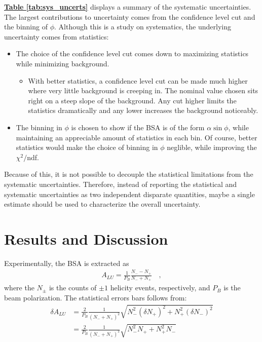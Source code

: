 \documentclass[10pt,prd,aps,showpacs,twocolumn,unsortedaddress]{revtex4-1}
\newcommand\lr[1]{\left( #1\right) }
\renewcommand\b[1]{{\textbf{#1}}}
\renewcommand\u[1]{{\underline{#1}}}
\newcommand\Tab[1]{\b{\u{Table #1}}}
\begin{document}
\Tab{\ref{tab:sys_uncerts}} displays a summary of the systematic uncertainties. The largest contributions to uncertainty comes from the confidence level cut and the binning of $\phi$. Although this is a study on systematics, the underlying uncertainty comes from statistics:
\begin{itemize}
  \item
    The choice of the confidence level cut comes down to maximizing statistics while minimizing background.
      \begin{itemize}
        \item
          With better statistics, a confidence level cut can be made much higher where very little background is creeping in. The nominal value chosen sits right on a steep slope of the background. Any cut higher limits the statistics dramatically and any lower increases the background noticeably.
       \end{itemize}
   \item
    The binning in $\phi$ is chosen to show if the BSA is of the form $\alpha \sin \phi$, while maintaining an appreciable amount of statistics in each bin. Of course, better statistics would make the choice of binning in $\phi$ neglible, while improving the $\chi^2/$ndf.
  \end{itemize}

  Because of this, it is not possible to decouple the statistical limitations from the systematic uncertainties. Therefore, instead of reporting the statistical and systematic uncertainties as two independent disparate quantities, maybe a single estimate should be used to characterize the overall uncertainty.
    
\section{Results and Discussion \label{results}}
  Experimentally, the BSA is extracted as
  \begin{align*}
    A_{LU} = \frac1{P_B}\frac{N_{-} - N_{+}}{N_{-} + N_{+}} \quad,
  \end{align*}
  where the $N_{\pm}$ is the counts of $\pm1$ helicity events, respectively, and $P_B$ is the beam polarization. The statistical errors bars follows from:
  \begin{align*}
    \delta A_{LU} &= \frac2{P_B}\frac1{\lr{N_{-} + N_{+}}^2}  \sqrt{ N_{-}^2  \lr{\delta N_{+}}^2 + N_{+}^2  \lr{\delta N_{-}}^2 } 
    \\
    &
             = \frac2{P_B}\frac1{\lr{N_{-} + N_{+}}^2}  \sqrt{ N_{-}^2  N_{+} + N_{+}^2  N_{-} } 
  \end{align*}
\end{document}
